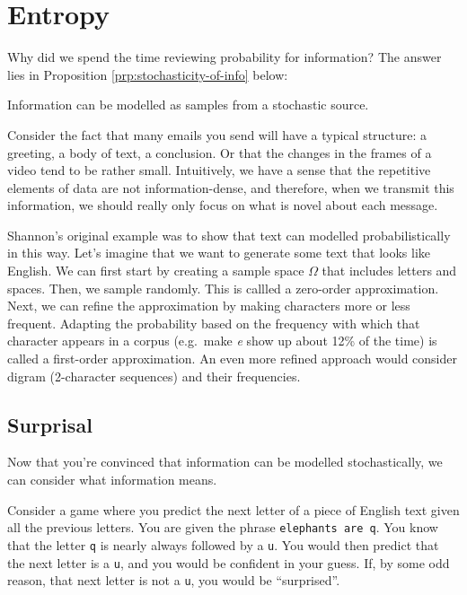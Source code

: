 \documentclass[13pt,oneside]{tufte-book}
\theoremstyle{definition}
\theoremstyle{definition}
\theoremstyle{definition}
\theoremstyle{remark}
\let\BeginKnitrBlock\begin \let\EndKnitrBlock\end
\begin{document}
\chapter{Entropy}\label{entropy}

Why did we spend the time reviewing probability for information? The
answer lies in Proposition \ref{prp:stochasticity-of-info} below:

\BeginKnitrBlock{proposition}[Stochasticity of Information]
\protect\hypertarget{prp:stochasticity-of-info}{}{\label{prp:stochasticity-of-info}
{} } Information can be
modelled as samples from a stochastic source.
\EndKnitrBlock{proposition}

Consider the fact that many emails you send will have a typical
structure: a greeting, a body of text, a conclusion. Or that the changes
in the frames of a video tend to be rather small. Intuitively, we have a
sense that the repetitive elements of data are not information-dense,
and therefore, when we transmit this information, we should really only
focus on what is novel about each message.

Shannon's original example was to show that text can modelled
probabilistically in this way. Let's imagine that we want to generate
some text that looks like English. We can first start by creating a
sample space \(\Omega\) that includes letters and spaces. Then, we
sample randomly. This is callled a zero-order approximation. Next, we
can refine the approximation by making characters more or less frequent.
Adapting the probability based on the frequency with which that
character appears in a corpus (e.g.~make \emph{e} show up about 12\% of
the time) is called a first-order approximation. An even more refined
approach would consider digram (2-character sequences) and their
frequencies.

\section{Surprisal}\label{surprisal}

Now that you're convinced that information can be modelled
stochastically, we can consider what information means.

\BeginKnitrBlock{example}[The Q-U Question]
\protect\hypertarget{exm:unnamed-chunk-37}{}{\label{exm:unnamed-chunk-37}
{} } Consider a game where you predict
the next letter of a piece of English text given all the previous
letters. You are given the phrase \texttt{elephants\ are\ q}. You know
that the letter \texttt{q} is nearly always followed by a \texttt{u}.
You would then predict that the next letter is a \texttt{u}, and you
would be confident in your guess. If, by some odd reason, that next
letter is not a \texttt{u}, you would be ``surprised''.
\EndKnitrBlock{example}
\end{document}
